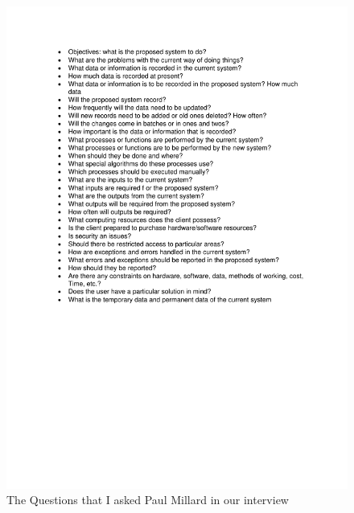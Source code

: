 \begin{figure}[H]
    \includegraphics[width=\textwidth]{./TeamCambridgeSpec/Questions.pdf}

    \caption{The Questions that I asked Paul Millard in our interview} \label{fig:Questions}
\end{figure}





